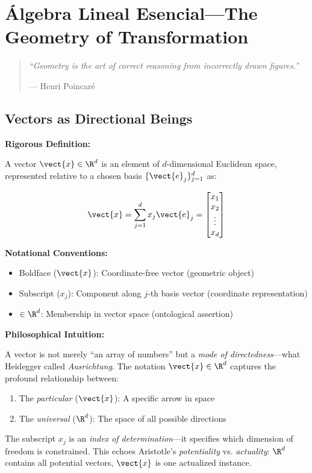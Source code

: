 \chapter{Álgebra Lineal Esencial---The Geometry of Transformation}

\begin{quote}
	\itshape
	``Geometry is the art of correct reasoning from incorrectly drawn figures.''
	
	\raggedleft--- Henri Poincaré
\end{quote}

\section{Vectors as Directional Beings}

\begin{seanbox}{1.1}
	\textbf{Rigorous Definition:}
	
	A vector $\vect{x} \in \R^d$ is an element of $d$-dimensional Euclidean space, represented relative to a chosen basis $\{\vect{e}_j\}_{j=1}^d$ as:
	
	\begin{equation}
		\vect{x} = \sum_{j=1}^d x_j \vect{e}_j = \begin{bmatrix} x_1 \\ x_2 \\ \vdots \\ x_d \end{bmatrix}
	\end{equation}
	
	\textbf{Notational Conventions:}
	\begin{itemize}
		\item Boldface ($\vect{x}$): Coordinate-free vector (geometric object)
		\item Subscript ($x_j$): Component along $j$-th basis vector (coordinate representation)
		\item $\in \R^d$: Membership in vector space (ontological assertion)
	\end{itemize}
\end{seanbox}

\begin{philobox}
	\textbf{Philosophical Intuition:}
	
	A vector is not merely ``an array of numbers'' but a \textit{mode of directedness}---what Heidegger called \textit{Ausrichtung}. The notation $\vect{x} \in \R^d$ captures the profound relationship between:
	
	\begin{enumerate}
		\item The \textit{particular} ($\vect{x}$): A specific arrow in space
		\item The \textit{universal} ($\R^d$): The space of all possible directions
	\end{enumerate}
	
	The subscript $x_j$ is an \textit{index of determination}---it specifies which dimension of freedom is constrained. This echoes Aristotle's \textit{potentiality} vs. \textit{actuality}: $\R^d$ contains all potential vectors, $\vect{x}$ is one actualized instance.
\end{philobox}

